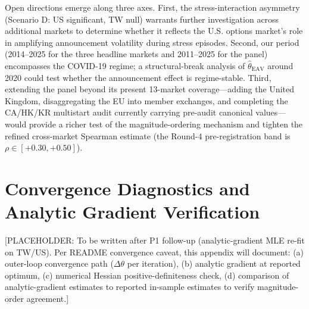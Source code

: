 \documentclass[12pt,a4paper]{article}
\begin{document}
Open directions emerge along three axes. First, the stress-interaction
asymmetry (Scenario D: US significant, TW null) warrants further
investigation across additional markets to determine whether it reflects
the U.S. options market's role in amplifying announcement volatility during
stress episodes. Second, our period (2014--2025 for the three headline markets
and 2011--2025 for the panel) encompasses the COVID-19 regime; a
structural-break analysis of $\hat{\theta}_{\mathrm{EAV}}$ around 2020 could
test whether the announcement effect is regime-stable. Third, extending the
panel beyond its present 13-market coverage---adding the United Kingdom,
disaggregating the EU into member exchanges, and completing the
CA/HK/KR multistart audit currently carrying pre-audit canonical values---would
provide a richer test of the magnitude-ordering mechanism and tighten the
refined cross-market Spearman estimate (the Round-4 pre-registration band is
$\rho \in [+0.30, +0.50]$).


\appendix

\section{Convergence Diagnostics and Analytic Gradient Verification}
\label{app:gradient}

[PLACEHOLDER: To be written after P1 follow-up (analytic-gradient MLE re-fit
on TW/US). Per README convergence caveat, this appendix will document:
(a) outer-loop convergence path ($\Delta\theta$ per iteration),
(b) analytic gradient at reported optimum,
(c) numerical Hessian positive-definiteness check,
(d) comparison of analytic-gradient estimates to reported in-sample estimates
to verify magnitude-order agreement.]




\end{document}

